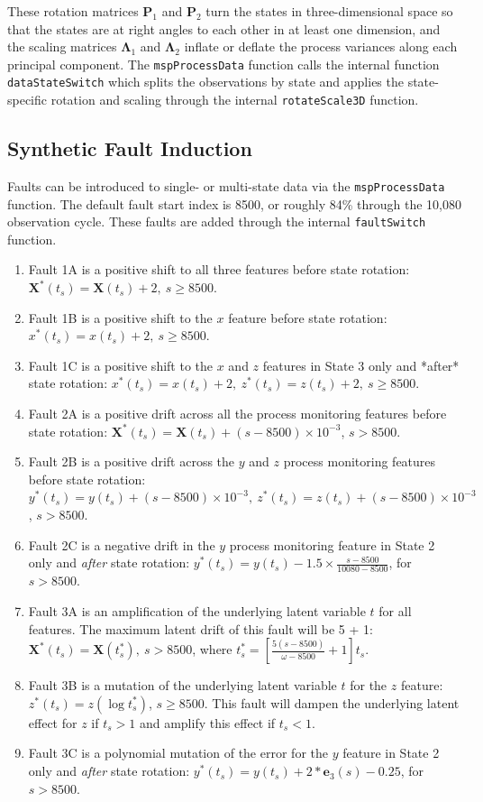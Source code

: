 \documentclass{report}\usepackage[]{graphicx}\usepackage[]{color}
\begin{document}
These rotation matrices $\textbf{P}_1$ and $\textbf{P}_2$ turn the states in three-dimensional space so that the states are at right angles to each other in at least one dimension, and the scaling matrices $\boldsymbol\Lambda_1$ and $\boldsymbol\Lambda_2$ inflate or deflate the process variances along each principal component. The \texttt{mspProcessData} function calls the internal function \texttt{dataStateSwitch} which splits the observations by state and applies the state-specific rotation and scaling through the internal \texttt{rotateScale3D} function.


\subsection{Synthetic Fault Induction}
Faults can be introduced to single- or multi-state data via the \texttt{mspProcessData} function. The default fault start index is 8500, or roughly 84\% through the 10,080 observation cycle. These faults are added through the internal \texttt{faultSwitch} function.
\begin{enumerate}
\item Fault 1A is a positive shift to all three features before state rotation: $\textbf{X}^*(t_s) = \textbf{X}(t_s) + 2,\ s \ge 8500$.
%
\item Fault 1B is a positive shift to the $x$ feature before state rotation: $x^*(t_s) = x(t_s) + 2,\ s \ge 8500$.
%
\item Fault 1C is a positive shift to the $x$ and $z$ features in State 3 only and *after* state rotation: $x^*(t_s) = x(t_s) + 2,\ z^*(t_s) = z(t_s) + 2,\ s \ge 8500$.
%
\item Fault 2A is a positive drift across all the process monitoring features before state rotation: $\textbf{X}^*(t_s) = \textbf{X}(t_s) + (s - 8500)\times 10^{-3}$, $s > 8500$.
%
\item Fault 2B is a positive drift across the $y$ and $z$ process monitoring features before state rotation: $y^*(t_s) = y(t_s) + (s - 8500)\times 10^{-3},\ z^*(t_s) = z(t_s) + (s - 8500)\times 10^{-3}$, $s > 8500$.
%
\item Fault 2C is a negative drift in the $y$ process monitoring feature in State 2 only and \emph{after} state rotation: $y^*(t_s) = y(t_s) - 1.5 \times \frac{s - 8500}{10080 - 8500}$, for $s > 8500$.
%
\item Fault 3A is an amplification of the underlying latent variable $t$ for all features. The maximum latent drift of this fault will be 5 + 1: $\textbf{X}^*(t_s) = \textbf{X}(t_s^*),\ s > 8500$, where $t_s^* = \left[\frac{5(s - 8500)}{\omega - 8500} + 1\right]t_s$.
%
\item Fault 3B is a mutation of the underlying latent variable $t$ for the $z$ feature: $z^*(t_s) = z(\log t_s^*)$, $s \ge 8500$. This fault will dampen the underlying latent effect for $z$ if $t_s > 1$ and amplify this effect if $t_s < 1$.
%
\item Fault 3C is a polynomial mutation of the error for the $y$ feature in State 2 only and \emph{after} state rotation: $y^*(t_s) = y(t_s) + 2 * \textbf{e}_3(s) - 0.25$, for $s > 8500$.
\end{enumerate}
\end{document}
